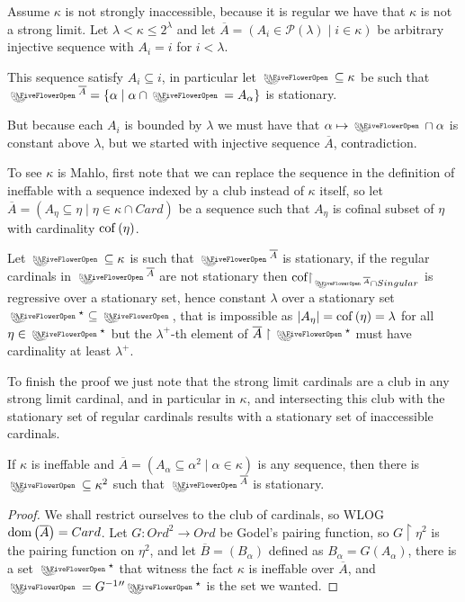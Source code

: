 \begin{cExercise}
	\begin{cPart}
		Assume $\kappa$ is not strongly inaccessible, because it is regular we have that $\kappa$ is not a strong limit. Let $\lambda<\kappa\le 2^\lambda$ and let $\overline A=(A_i\in \mathcal P(\lambda)\mid i\in\kappa)$ be arbitrary injective sequence with $A_i=i$ for $i<\lambda$.
		
		This sequence satisfy $A_i\subseteq i$, in particular let $\flower\subseteq \kappa$ be such that $\flower^{\overline A}=\{\alpha\mid \alpha\cap \flower=A_\alpha\}$ is stationary.
		
		But because each $A_i$ is bounded by $\lambda$ we must have that $\alpha\mapsto \flower \cap \alpha$ is constant above $\lambda$, but we started with injective sequence $\overline A$, contradiction.
		
		To see $\kappa$ is Mahlo, first note that we can replace the sequence in the definition of ineffable with a sequence indexed by a club instead of $\kappa$ itself, so let $\overline A=(A_\eta\subseteq \eta\mid \eta\in\kappa\cap Card)$ be a sequence such that $A_\eta$ is cofinal subset of $\eta$ with cardinality $\operatorname{cof}\left(\eta\right)$.
		
		Let $\flower\subseteq \kappa$ is such that $\flower^{\overline A}$ is stationary, if the regular cardinals in $\flower^{\overline A}$ are not stationary then $\operatorname{cof}\!\!\restriction_{\flower^{\overline A}\cap Singular}$ is regressive over a stationary set, hence constant $\lambda$ over a stationary set $\flower^\star\subseteq\flower$, that is impossible as $|A_\eta|=\operatorname{cof}\left(\eta\right)=\lambda$ for all $\eta\in\flower^\star$ but the $\lambda^+$-th element of $\overline A\restriction \flower^\star$ must have cardinality at least $\lambda^+$.
		
		To finish the proof we just note that the strong limit cardinals are a club in any strong limit cardinal, and in particular in $\kappa$, and intersecting this club with the stationary set of regular cardinals results with a stationary set of inaccessible cardinals.
	\end{cPart}
	\begin{cPart}
		\begin{lemma}
			If $\kappa$ is ineffable and $\overline A=(A_\alpha\subseteq \alpha^2\mid\alpha\in\kappa)$ is any sequence, then there is $\flower\subseteq \kappa^2$ such that $\flower^{\overline A}$ is stationary.
		\end{lemma}
		\begin{proof}
			We shall restrict ourselves to the club of cardinals, so WLOG $\operatorname{dom}\left(\overline{A}\right)=Card$. Let $G:Ord^2\to Ord$ be Godel's pairing function, so $G\restriction\eta^2$ is the pairing function on $\eta^2$, and let $\overline B=(B_\alpha)$ defined as $B_\alpha=G(A_\alpha)$, there is a set $\flower^\star$ that witness the fact $\kappa$ is ineffable over $\overline A$, and $\flower=G^{-1}{''}\flower^\star$ is the set we wanted.
		\end{proof}
		

\end{cPart}
\end{cExercise}
